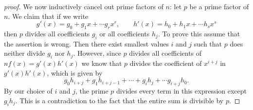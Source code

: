 \documentclass[]{scrartcl}
\newcommand{\<}{\trianglelefteq}
\begin{document}
\begin{itemize}
\begin{proof}[proof]
		We now inductively cancel out prime factors of $n$: 
		let $ p $ be a prime factor of $ n $. 
		We claim that if we write 
		$$
		g'(x) = g_0 + g_1 x + \cdots g_r x^r, \qquad 
		h'(x) = h_0 + h_1 x + \cdots h_s x^s
		$$ 
		then $ p $ divides all coefficients $ g_i $ or 
		all coefficients $ h_j $. To prove this assume that 
		the assertion is wrong. Then there exist smallest values 
		$ i $ and $ j $ such that 
		$ p $ does neither divide $ g_i $ nor $ h_j $. However, since $ p $ divides all coefficients of $ n f(x) = g'(x) h'(x) $ 
		we know that $ p $ divides the coefficient of $ x^{i + j} $ in $ g'(x) h'(x) $, which is given by 
		$$
		g_0 h_{i + j} + g_1 h_{i + j - 1} + \cdots + g_i h_j + \cdots g_{i + j} h_0. 
		$$
		By our choice of $ i $ and $ j $, the prime $ p $ divides every term in this expression except $ g_i h_j $. 
		This is a contradiction to the fact that the entire sum is divisible by $ p $. 
		

\end{proof}
\end{itemize}
\end{document}
